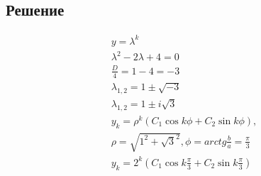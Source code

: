 \subsection{Решение}
\begin{gather*}
	y = \lambda^k \\
	\lambda^2 - 2\lambda + 4 = 0 \\
	\frac{D}{4} = 1 - 4 = -3 \\
	\lambda_{1,2} = 1 \pm \sqrt{-3} \\
	\lambda_{1,2} = 1 \pm i\sqrt{3} \\
	y_{k} = \rho^k(C_1\cos{k\phi} + C_2\sin{k\phi}), \\
	\rho = \sqrt{1^2 + \sqrt{3}^2}, \phi = arctg{\frac{b}{a}} = \frac{\pi}{3} \\
	y_{k} = 2^k\left(C_1\cos{k\frac{\pi}{3}} + C_2\sin{k\frac{\pi}{3}}\right) \\
\end{gather*}
